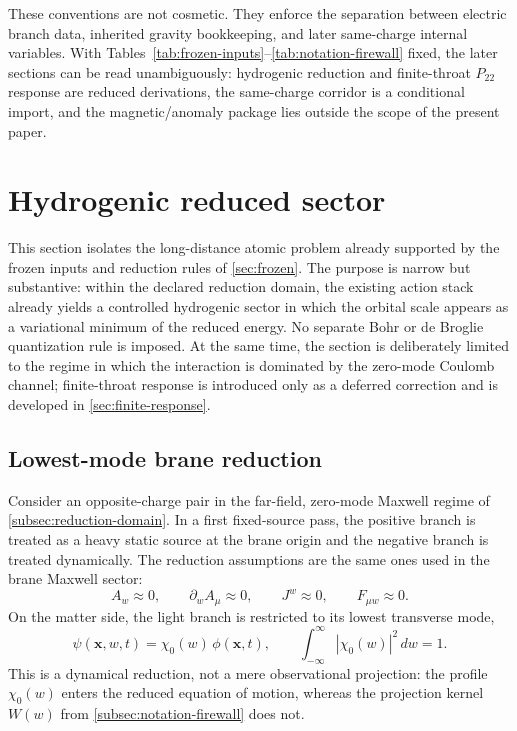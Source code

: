 \documentclass[11pt]{article}
\theoremstyle{plain}
\theoremstyle{definition}
\theoremstyle{remark}
\newcommand{\Ptwotwo}{P_{22}}
\begin{document}
These conventions are not cosmetic. They enforce the separation between electric branch data, inherited gravity bookkeeping, and later same-charge internal variables. With Tables~\ref{tab:frozen-inputs}--\ref{tab:notation-firewall} fixed, the later sections can be read unambiguously: hydrogenic reduction and finite-throat $\Ptwotwo$ response are reduced derivations, the same-charge corridor is a conditional import, and the magnetic/anomaly package lies outside the scope of the present paper.


\section{Hydrogenic reduced sector}\label{sec:hydrogenic}

This section isolates the long-distance atomic problem already supported by the frozen inputs and reduction rules of \cref{sec:frozen}. The purpose is narrow but substantive: within the declared reduction domain, the existing action stack already yields a controlled hydrogenic sector in which the orbital scale appears as a variational minimum of the reduced energy. No separate Bohr or de Broglie quantization rule is imposed. At the same time, the section is deliberately limited to the regime in which the interaction is dominated by the zero-mode Coulomb channel; finite-throat response is introduced only as a deferred correction and is developed in \cref{sec:finite-response}.

\subsection{Lowest-mode brane reduction}\label{subsec:lowest-mode-reduction}

Consider an opposite-charge pair in the far-field, zero-mode Maxwell regime of \cref{subsec:reduction-domain}. In a first fixed-source pass, the positive branch is treated as a heavy static source at the brane origin and the negative branch is treated dynamically. The reduction assumptions are the same ones used in the brane Maxwell sector:
\begin{equation}
A_w\approx 0,
\qquad
\partial_w A_\mu\approx 0,
\qquad
J^w\approx 0,
\qquad
F_{\mu w}\approx 0.
\label{eq:hydrogenic-zero-mode-regime}
\end{equation}
On the matter side, the light branch is restricted to its lowest transverse mode,
\begin{equation}
\psi(\mathbf x,w,t)=\chi_0(w)\,\phi(\mathbf x,t),
\qquad
\int_{-\infty}^{\infty}|\chi_0(w)|^2\,dw=1.
\label{eq:lowest-transverse-factorization}
\end{equation}
This is a dynamical reduction, not a mere observational projection: the profile $\chi_0(w)$ enters the reduced equation of motion, whereas the projection kernel $W(w)$ from \cref{subsec:notation-firewall} does not.
\end{document}
